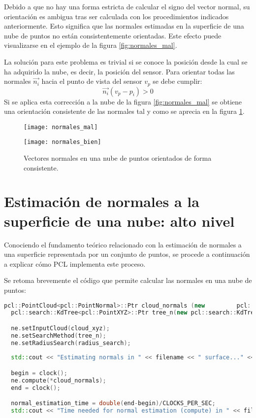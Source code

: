 Debido a que no hay una forma estricta de calcular el signo del vector normal, su orientación es ambigua tras ser calculada con los procedimientos indicados anteriormente. Esto significa que las normales estimadas en la superficie de una nube de puntos no están consistentemente orientadas. Este efecto puede visualizarse en el ejemplo de la figura \ref{fig:normales_mal}.

La solución para este problema es trivial si se conoce la posición desde la cual se ha adquirido la nube, es decir, la posición del sensor. Para orientar todas las normales $\vec{n_i}$ hacia el punto de vista del sensor $v_p$ se debe cumplir:
$$\vec{n_i}(v_p-p_i)>0$$
Si se aplica esta corrección a la nube de la figura \ref{fig:normales_mal} se obtiene una orientación consistente de las normales tal y como se aprecia en la figura \ref{fig:normales_bien}.

\begin{figure}[!htb]
  \texttt{[image: normales\_mal]}
  \caption{Vectores normales en una nube de puntos orientados de forma inconsistente.}\label{fig:normales_mal}
\endminipage\hfill
{}
  \texttt{[image: normales\_bien]}
  \caption{Vectores normales en una nube de puntos orientados de forma consistente.}\label{fig:normales_bien}
\endminipage\hfill
\end{figure}


\section{Estimación de normales a la superficie de una nube: alto nivel}
Conociendo el fundamento teórico relacionado con la estimación de normales a una superficie representada por un conjunto de puntos, se procede a continuación a explicar cómo PCL implementa este proceso.

Se retoma brevemente el código que permite calcular las normales en una nube de puntos:

\begin{lstlisting}[language=C++,breaklines]
  pcl::PointCloud<pcl::PointNormal>::Ptr cloud_normals (new 		pcl::PointCloud<pcl::PointNormal>);
  pcl::search::KdTree<pcl::PointXYZ>::Ptr tree_n(new pcl::search::KdTree<pcl::PointXYZ>());

  ne.setInputCloud(cloud_xyz);
  ne.setSearchMethod(tree_n);
  ne.setRadiusSearch(radius_search);
 
  std::cout << "Estimating normals in " << filename << " surface..." <<std::endl;

  begin = clock();
  ne.compute(*cloud_normals);
  end = clock();

  normal_estimation_time = double(end-begin)/CLOCKS_PER_SEC;
  std::cout << "Time needed for normal estimation (compute) in " << filename << ": " << normal_estimation_time << " seconds" << std::endl << std::endl;
\end{lstlisting}

